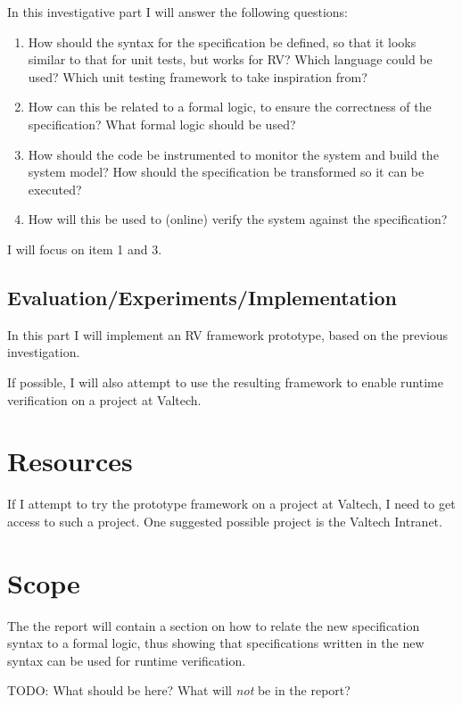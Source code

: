 \documentclass[a4paper,11pt]{article}
\begin{document}
In this investigative part I will answer the following questions:

\begin{enumerate}
	\item How should the syntax for the specification be defined,
	so that it looks similar to that for unit tests, but works for RV?
		Which language could be used? Which unit testing framework to take inspiration from?
	\item How can this be related to a formal logic, to ensure the correctness of the specification?
		What formal logic should be used? 
	\item How should the code be instrumented to monitor the system and build the system model?
		How should the specification be transformed so it can be executed? 
	\item How will this be used to (online) verify the system against the specification?
\end{enumerate}

I will focus on item 1 and 3.

\subsection{Evaluation/Experiments/Implementation}

In this part I will implement an RV framework prototype, based on the previous
investigation.

If possible, I will also attempt to use the resulting framework to enable runtime verification on a project at Valtech.


\section{Resources}

If I attempt to try the prototype framework on a project at Valtech, I need to get access to such a project. One suggested possible project is the Valtech Intranet.


\section{Scope}

The the report will contain a section on how to relate the new specification syntax to a formal logic, thus showing that specifications written in the new syntax can be used for runtime verification.

TODO: What should be here? What will \emph{not} be in the report?
\end{document}
